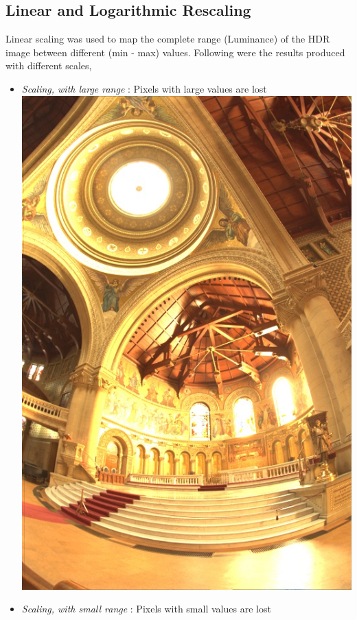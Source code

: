 \documentclass{article}
\begin{document}
    \subsection*{Linear and Logarithmic Rescaling}
    Linear scaling was used to map the complete range (Luminance) of the HDR image between different (min - max) values. Following were the results produced with different scales,
    \begin{itemize}
        \item \textit{Scaling, with large range} : Pixels with large values are lost \\
        \includegraphics[scale=.25]{./data/1/linscl/mn.jpg}
        \item \textit{Scaling, with small range} : Pixels with small values are lost\\

\end{itemize}
\end{document}
